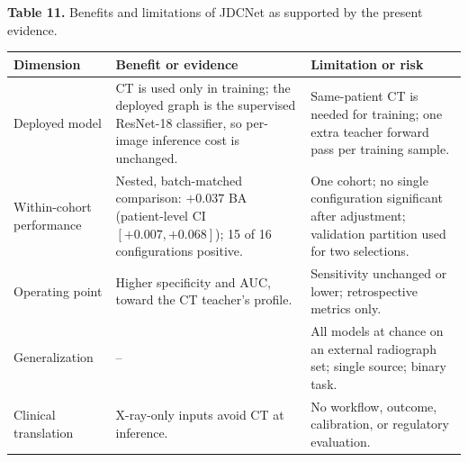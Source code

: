 \documentclass[pdflatex,sn-vancouver,Numbered]{sn-jnl}
\begin{document}
\begin{minipage}{\textwidth}
{\small\noindent\textbf{Table 11.} Benefits and limitations of JDCNet as supported by the present evidence.\par}
\vspace{6pt}


\centering
\footnotesize
\setlength{\tabcolsep}{3pt}
\renewcommand{\arraystretch}{0.95}
\begin{tabularx}{\columnwidth}{|>{\raggedright\arraybackslash}p{}|>{\raggedright\arraybackslash}p{}|>{\raggedright\arraybackslash}X|}
\hline
Dimension & Benefit or evidence & Limitation or risk \\ \hline
Deployed model & CT is used only in training; the deployed graph is the supervised ResNet-18 classifier, so per-image inference cost is unchanged. & Same-patient CT is needed for training; one extra teacher forward pass per training sample. \\ \hline
Within-cohort performance & Nested, batch-matched comparison: $+0.037$ BA (patient-level CI $[+0.007,+0.068]$); 15 of 16 configurations positive. & One cohort; no single configuration significant after adjustment; validation partition used for two selections. \\ \hline
Operating point & Higher specificity and AUC, toward the CT teacher's profile. & Sensitivity unchanged or lower; retrospective metrics only. \\ \hline
Generalization & -- & All models at chance on an external radiograph set; single source; binary task. \\ \hline
Clinical translation & X-ray-only inputs avoid CT at inference. & No workflow, outcome, calibration, or regulatory evaluation. \\ \hline
\end{tabularx}
\end{minipage}
\clearpage
\end{document}
